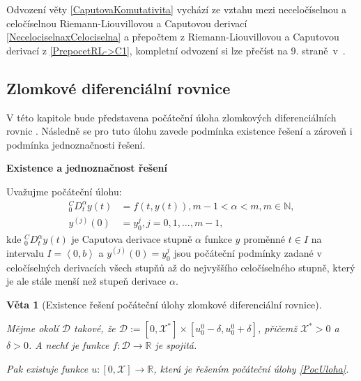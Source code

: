 \documentclass[a4paper,12pt,twoside]{article}
\newtheorem{veta}{Věta}[section]
\theoremstyle{definition}
\theoremstyle{remark}
\numberwithin{equation}{section}
\numberwithin{table}{section}
\numberwithin{figure}{section}
\newcommand{\R}{\mathbb{R}}
\newcommand{\N}{\mathbb{N}}
\begin{document}
Odvození věty \ref{CaputovaKomutativita} vychází ze vztahu mezi neceločíselnou a celočíselnou Riemann-Liouvillovou a Caputovou derivací \eqref{NecelociselnaxCelociselna} a přepočtem z Riemann-Liouvillovou a Caputovou derivací z \eqref{PrepocetRL->C1}, kompletní odvození si lze přečíst na 9. straně~v~\cite{Cangpin}.


\subsection{Zlomkové diferenciální rovnice}
V této kapitole bude představena počáteční úloha zlomkových diferenciálních rovnic \cite{Cangpin}. Následně se pro tuto úlohu zavede podmínka existence řešení a zároveň i podmínka jednoznačnosti řešení.

\medskip
\noindent \textbf{Existence a jednoznačnost řešení} 

\medskip 
\noindent Uvažujme počáteční úlohu:
\begin{equation} \label{PocUloha}
	\begin{aligned}
		^{C}_{0}D^{\alpha}_{t} y \left(t\right) &= f\left(t,y\left(t\right)\right), m-1 < \alpha < m, m \in \N, \\
		y^{\left(j\right)} \left(0\right) &= y_{0}^{j}, j=0,1,..., m-1,
	\end{aligned}	
\end{equation}
kde $^{C}_{0}D^{\alpha}_{t} y \left(t\right)$ je Caputova derivace stupně $\alpha$ funkce $y$ proměnné $t \in I$ na intervalu $I = \left\langle 0, b \right\rangle$ a $y^{\left(j\right)} \left(0\right) = y_{0}^{j}$ jsou počáteční podmínky zadané v celočíselných derivacích všech stupňů až do nejvyššího celočíselného stupně, který je ale stále menší než stupeň derivace $\alpha$.

\begin{veta}[Existence řešení počáteční úlohy zlomkové diferenciální rovnice]\label{ExistenceFDE}
	
	Mějme okolí $\mathcal{D}$ takové, že $\mathcal{D} := \left[0,\mathcal{X} ^{*}\right] \times \left[u_{0}^{0} - \delta , u_{0}^{0} + \delta \right] $, přičemž $\mathcal{X}^{*}>0$ a $ \delta  > 0$. A nechť je funkce $f: \mathcal{D} \to \R$ je spojitá.
	
	Pak existuje funkce $u:\left[0, \mathcal{X}\right] \to \R$, která je řešením počáteční úlohy \eqref{PocUloha}.
\end{veta} 
\end{document}
